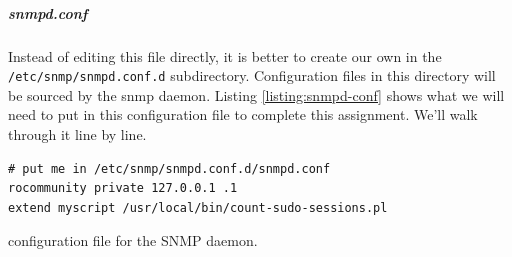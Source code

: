 \documentclass{article}
\begin{document}
\subparagraph{snmpd.conf}

Instead of editing this file directly, it is better to create our own in the
\verb|/etc/snmp/snmpd.conf.d| subdirectory. Configuration files in this
directory will be sourced by the snmp daemon. Listing \ref{listing:snmpd-conf}
shows what we will need to put in this configuration file to complete this
assignment. We'll walk through it line by line.

\begin{listing}[h]
\begin{verbatim}
# put me in /etc/snmp/snmpd.conf.d/snmpd.conf
rocommunity private 127.0.0.1 .1
extend myscript /usr/local/bin/count-sudo-sessions.pl
\end{verbatim}
\caption{configuration file for the SNMP daemon.}
\label{listing:snmpd-conf}
\end{listing}
\end{document}
